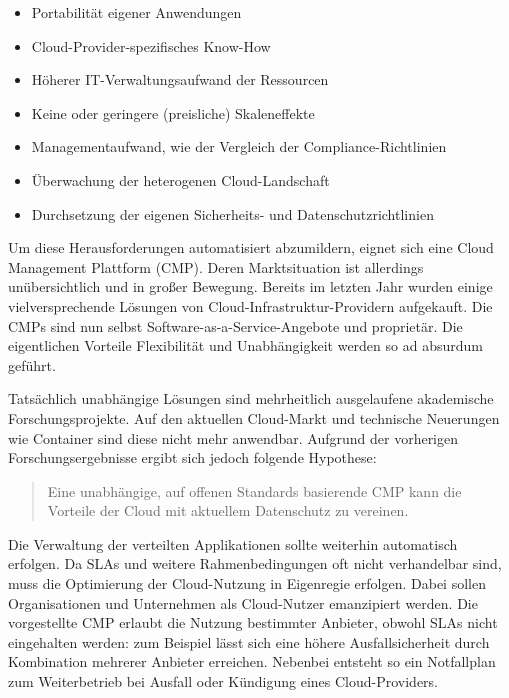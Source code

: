 \begin{itemize}
	\item Portabilität eigener Anwendungen
	\item Cloud-Provider-spezifisches Know-How
	\item Höherer IT-Verwaltungsaufwand der Ressourcen
	\item Keine oder geringere (preisliche) Skaleneffekte
	\item Managementaufwand, wie der Vergleich der Compliance-Richtlinien
	\item Überwachung der heterogenen Cloud-Landschaft
	\item Durchsetzung der eigenen Sicherheits- und Datenschutzrichtlinien
\end{itemize}

\noindent
Um diese Herausforderungen automatisiert abzumildern, eignet sich eine Cloud Management Plattform (CMP). Deren Marktsituation ist allerdings unübersichtlich und in großer Bewegung. Bereits im letzten Jahr wurden einige vielversprechende Lösungen von Cloud-Infrastruktur-Providern aufgekauft. Die CMPs sind nun selbst Software-as-a-Service-Angebote und proprietär. Die eigentlichen Vorteile Flexibilität und Unabhängigkeit werden so ad absurdum geführt.

Tatsächlich unabhängige Lösungen sind mehrheitlich ausgelaufene akademische Forschungsprojekte. Auf den aktuellen Cloud-Markt und technische Neuerungen wie Container sind diese nicht mehr anwendbar. Aufgrund der vorherigen Forschungsergebnisse ergibt sich jedoch folgende Hypothese:


\begin{verse}
{Eine unabhängige, auf offenen Standards basierende CMP kann die Vorteile der Cloud mit aktuellem Datenschutz zu vereinen.}
\end{verse}

\noindent Die Verwaltung der verteilten Applikationen sollte weiterhin automatisch erfolgen. Da SLAs und weitere Rahmenbedingungen oft nicht verhandelbar sind, muss die Optimierung der Cloud-Nutzung in Eigenregie erfolgen. Dabei sollen Organisationen und Unternehmen als Cloud-Nutzer emanzipiert werden. Die vorgestellte CMP erlaubt die Nutzung bestimmter Anbieter, obwohl SLAs  nicht eingehalten werden: zum Beispiel lässt sich eine höhere Ausfallsicherheit durch Kombination mehrerer Anbieter erreichen. Nebenbei entsteht so ein Notfallplan zum Weiterbetrieb bei Ausfall oder Kündigung eines Cloud-Providers.


